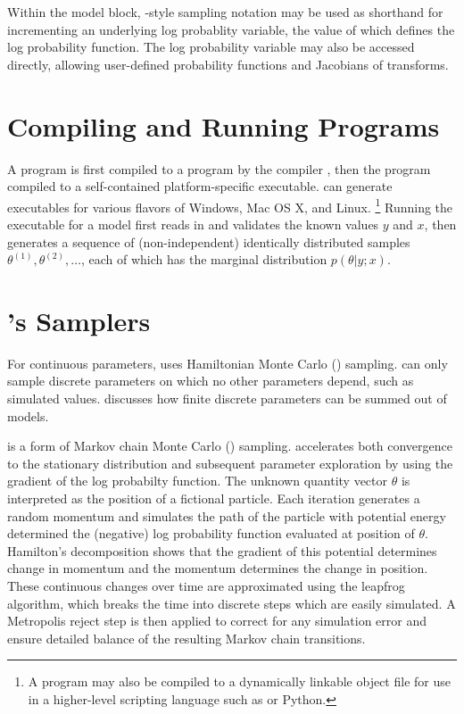Within the model block, \BUGS-style sampling notation may be used as
shorthand for incrementing an underlying log probablity variable, the
value of which defines the log probability function.  The log
probability variable may also be accessed directly, allowing
user-defined probability functions and Jacobians of transforms.


\section{Compiling and Running \Stan Programs}

A \Stan program is first compiled to a \Cpp program by the \Stan
compiler \stanc, then the \Cpp program compiled to a self-contained
platform-specific executable.  \Stan can generate executables for
various flavors of Windows, Mac OS X, and Linux.%
%
\footnote{A \Stan program may also be compiled to a dynamically
  linkable object file for use in a higher-level scripting language
  such as \R or Python.}
%
Running the \Stan executable for a model first reads in and validates
the known values $y$ and $x$, then generates a sequence of
(non-independent) identically distributed samples $\theta^{(1)},
\theta^{(2)}, \ldots$, each of which has the marginal distribution
$p(\theta|y;x)$.


\section{\Stan's Samplers}

For continuous parameters, \Stan uses Hamiltonian Monte Carlo (\HMC)
sampling.   can only sample discrete parameters on which no
other parameters depend, such as simulated values.
 discusses how finite discrete parameters
can be summed out of models.

\HMC is a form of Markov chain Monte Carlo (\MCMC) sampling.  \HMC
accelerates both convergence to the stationary distribution and
subsequent parameter exploration by using the gradient of the log
probabilty function.  The unknown quantity vector $\theta$ is
interpreted as the position of a fictional particle.  Each iteration
generates a random momentum and simulates the path of the particle
with potential energy determined the (negative) log probability
function evaluated at position of $\theta$.  Hamilton's decomposition
shows that the gradient of this potential determines change in
momentum and the momentum determines the change in position.  These
continuous changes over time are approximated using the leapfrog
algorithm, which breaks the time into discrete steps which are easily
simulated.  A Metropolis reject step is then applied to correct for
any simulation error and ensure detailed balance of the resulting
Markov chain transitions.

